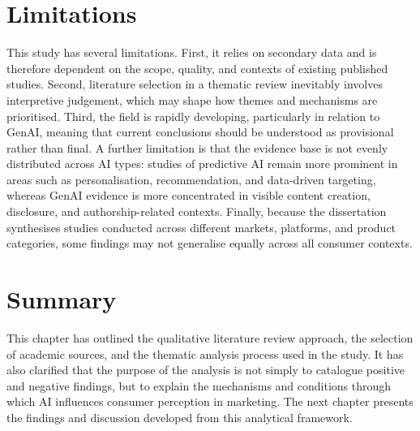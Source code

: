 \section{Limitations}
This study has several limitations. First, it relies on secondary data and is therefore dependent on the scope, quality, and contexts of existing published studies. Second, literature selection in a thematic review inevitably involves interpretive judgement, which may shape how themes and mechanisms are prioritised. Third, the field is rapidly developing, particularly in relation to GenAI, meaning that current conclusions should be understood as provisional rather than final. A further limitation is that the evidence base is not evenly distributed across AI types: studies of predictive AI remain more prominent in areas such as personalisation, recommendation, and data-driven targeting, whereas GenAI evidence is more concentrated in visible content creation, disclosure, and authorship-related contexts. Finally, because the dissertation synthesises studies conducted across different markets, platforms, and product categories, some findings may not generalise equally across all consumer contexts.

\section{Summary}
This chapter has outlined the qualitative literature review approach, the selection of academic sources, and the thematic analysis process used in the study. It has also clarified that the purpose of the analysis is not simply to catalogue positive and negative findings, but to explain the mechanisms and conditions through which AI influences consumer perception in marketing. The next chapter presents the findings and discussion developed from this analytical framework.
